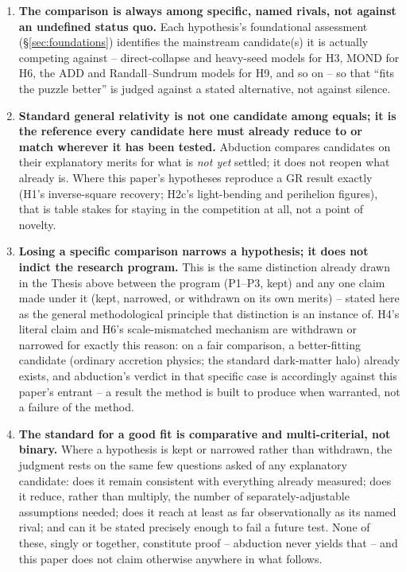 \documentclass[12pt, a4paper]{article}
\begin{document}
\begin{enumerate}
  \item \textbf{The comparison is always among specific, named
    rivals, not against an undefined status quo.} Each hypothesis's
    foundational assessment (\S\ref{sec:foundations}) identifies the
    mainstream candidate(s) it is actually competing against --
    direct-collapse and heavy-seed models for H3, MOND for H6, the
    ADD and Randall--Sundrum models for H9, and so on -- so that
    ``fits the puzzle better'' is judged against a stated alternative,
    not against silence.
  \item \textbf{Standard general relativity is not one candidate among
    equals; it is the reference every candidate here must already
    reduce to or match wherever it has been tested.} Abduction
    compares candidates on their explanatory merits for what is
    \emph{not yet} settled; it does not reopen what already is. Where
    this paper's hypotheses reproduce a GR result exactly (H1's
    inverse-square recovery; H2c's light-bending and perihelion
    figures), that is table stakes for staying in the competition at
    all, not a point of novelty.
  \item \textbf{Losing a specific comparison narrows a hypothesis; it
    does not indict the research program.} This is the same
    distinction already drawn in the Thesis above between the program
    (P1--P3, kept) and any one claim made under it (kept, narrowed, or
    withdrawn on its own merits) -- stated here as the general
    methodological principle that distinction is an instance of. H4's
    literal claim and H6's scale-mismatched mechanism are withdrawn or
    narrowed for exactly this reason: on a fair comparison, a
    better-fitting candidate (ordinary accretion physics; the
    standard dark-matter halo) already exists, and abduction's verdict
    in that specific case is accordingly against this paper's entrant
    -- a result the method is built to produce when warranted, not a
    failure of the method.
  \item \textbf{The standard for a good fit is comparative and
    multi-criterial, not binary.} Where a hypothesis is kept or
    narrowed rather than withdrawn, the judgment rests on the same few
    questions asked of any explanatory candidate: does it remain
    consistent with everything already measured; does it reduce,
    rather than multiply, the number of separately-adjustable
    assumptions needed; does it reach at least as far observationally
    as its named rival; and can it be stated precisely enough to fail
    a future test. None of these, singly or together, constitute
    proof -- abduction never yields that -- and this paper does not
    claim otherwise anywhere in what follows.
\end{enumerate}
\end{document}
